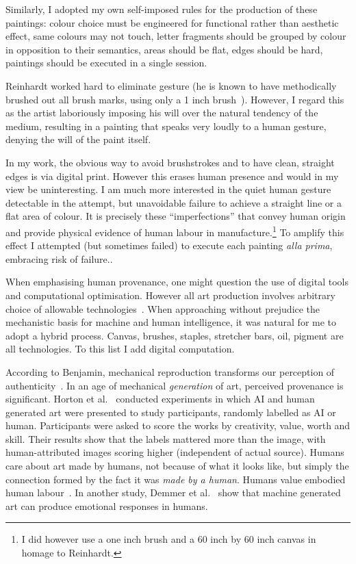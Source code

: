 \documentclass[12pt]{article}
\begin{document}
Similarly, I adopted my own self-imposed rules for the production of
these paintings: colour choice must be engineered for functional
rather than aesthetic effect, same colours may not touch, letter
fragments should be grouped by colour in opposition to their
semantics, areas should be flat, edges should be hard, paintings
should be executed in a single session.

Reinhardt worked hard to eliminate gesture (he is known to have
methodically brushed out all brush marks, using only a 1 inch
brush~\cite[p. 206]{artasart}). However, I regard this as the artist
laboriously imposing his will over the natural tendency of the medium,
resulting in a painting that speaks very loudly to a human gesture,
denying the will of the paint itself.

In my work, the obvious way to avoid brushstrokes and to have clean,
straight edges is via digital print. However this erases human
presence and would in my view be uninteresting. I am much more
interested in the quiet human gesture detectable in the attempt, but
unavoidable failure to achieve a straight line or a flat area of
colour. It is precisely these ``imperfections'' that convey human
origin and provide physical evidence of human labour in
manufacture.\footnote{I did however use a one inch brush and a 60 inch
  by 60 inch canvas in homage to Reinhardt.} To amplify this effect I
attempted (but sometimes failed) to execute each painting \emph{alla
  prima}, embracing risk of
failure.\cite{rosenberg1952american,moholy1947vision,bois1990painting}.

When emphasising human provenance, one might question the use of
digital tools and computational optimisation. However all art
production involves arbitrary choice of allowable
technologies~\cite{huizinga1938homo,kubler1962shape,flusser2000towards,manovich2001language,steyerl2009poorimage,perec1969disparition}.
When approaching without prejudice the mechanistic basis for machine
and human intelligence, it was natural for me to adopt a hybrid
process.  Canvas, brushes, staples, stretcher bars, oil, pigment are
all technologies. To this list I add digital computation.

According to Benjamin, mechanical reproduction transforms our
perception of authenticity~\cite{benjamin1969art}. In an age of
mechanical \emph{generation} of art, perceived provenance is
significant. Horton et al.~\cite{horton2023bias} conducted experiments
in which AI and human generated art were presented to study
participants, randomly labelled as AI or human. Participants were
asked to score the works by creativity, value, worth and skill. Their
results show that the labels mattered more than the image, with
human-attributed images scoring higher (independent of actual source).
Humans care about art made by humans, not because of what it looks
like, but simply the connection formed by the fact it was \emph{made
  by a human}. Humans value embodied human
labour~\cite{adorno1970aesthetic,singerman1999artist,sennett2008craftsman}. In
another study, Demmer et al.~\cite{demmer2023does} show that machine
generated art can produce emotional responses in humans.
\end{document}
